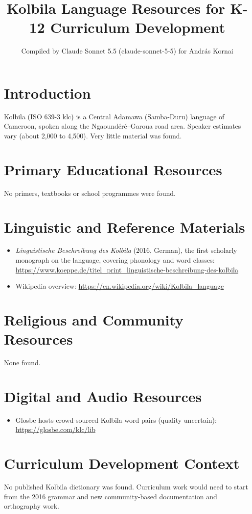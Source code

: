 \documentclass[12pt]{article}
\title{Kolbila Language Resources for K-12 Curriculum Development}
\author{Compiled by Claude Sonnet 5.5 (claude-sonnet-5-5) for Andr\'as Kornai}
\date{}
\begin{document}
\maketitle

\section{Introduction}
Kolbila (ISO 639-3 klc) is a Central Adamawa (Samba-Duru) language of Cameroon, spoken along the Ngaound\'er\'e--Garoua road area. Speaker estimates vary (about 2,000 to 4,500). Very little material was found.

\section{Primary Educational Resources}
No primers, textbooks or school programmes were found.

\section{Linguistic and Reference Materials}
\begin{itemize}
\item \emph{Linguistische Beschreibung des Kolbila} (2016, German), the first scholarly monograph on the language, covering phonology and word classes: \url{https://www.koeppe.de/titel_print_linguistische-beschreibung-des-kolbila}
\item Wikipedia overview: \url{https://en.wikipedia.org/wiki/Kolbila_language}
\end{itemize}

\section{Religious and Community Resources}
None found.

\section{Digital and Audio Resources}
\begin{itemize}
\item Glosbe hosts crowd-sourced Kolbila word pairs (quality uncertain): \url{https://glosbe.com/klc/lib}
\end{itemize}

\section{Curriculum Development Context}
No published Kolbila dictionary was found. Curriculum work would need to start from the 2016 grammar and new community-based documentation and orthography work.
\end{document}
